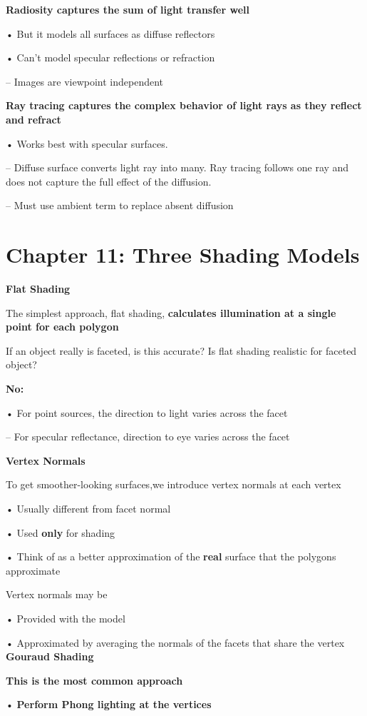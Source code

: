 \documentclass[]{report}
\begin{document}
\textbf{Radiosity captures the sum of light transfer well}

• But it models all surfaces as diffuse reflectors

• Can’t model specular reflections or refraction

– Images are viewpoint independent

\textbf{Ray tracing captures the complex behavior of light rays as they
reflect and refract}

• Works best with specular surfaces.

– Diffuse surface converts light ray into many. Ray tracing follows
one ray and does not capture the full effect of the diffusion.

– Must use ambient term to replace absent diffusion\\


\section*{Chapter 11: Three Shading Models}
\textbf{Flat Shading}

The simplest approach, flat shading, \textbf{calculates
illumination at a single point for each polygon}

If an object really is faceted, is this accurate? Is flat shading realistic for faceted object?

\textbf{No:}

• For point sources, the direction to light varies across the
facet

– For specular reflectance, direction to eye
varies across the facet

\textbf{Vertex Normals}

To get smoother-looking surfaces,we introduce vertex
normals at each vertex

• Usually different from facet normal

• Used \textbf{only} for shading

• Think of as a better approximation of the \textbf{real} surface that the
polygons approximate

Vertex normals may be

• Provided with the model

• Approximated by
averaging the normals
of the facets that
share the vertex\\
\textbf{Gouraud Shading}

\textbf{This is the most common approach}

• \textbf{Perform Phong lighting at the vertices}
\end{document}
